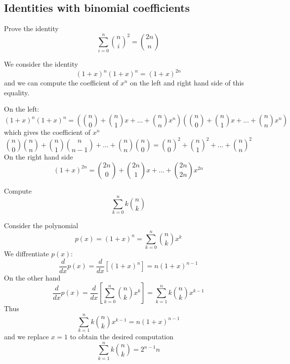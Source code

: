 \subsection*{Identities with binomial coefficients}

\begin{example}
Prove the identity
$$
\sum_{i=0}^{n} \binom{ n}  {i } ^{2}=\binom{ 2n}  {n }
$$

We consider the identity
$$
(1+x)^{n}(1+x)^{n}=(1+x)^{2n}
$$
and we can compute the coefficient of $x^{n}$ on the left and right hand side of this equality.

On the left:
$$
(1+x)^{n}(1+x)^{n}=(\binom{ n}  {0 } +\binom{ n}  {1 } x+\dots +\binom{ n}  {n}x^{n} )(\binom{ n}  {0 } +\binom{ n}  {1 } x+\dots +\binom{ n}  {n } x^{n})
$$
which gives the coefficient of $x^{n}$
$$
\binom{ n}  {0 } \binom{ n}  {n } +\binom{ n}  {1 } \binom{ n}  {n-1 } +\dots +\binom{ n}  {n } \binom{ n}  {0 } =\binom{ n}  {0 } ^{2}+\binom{ n}  {1 } ^{2}+\dots +\binom{ n}  {n } ^{2}
$$
On the right hand side
$$
(1+x)^{2n}=\binom{ 2n}  {0 } +\binom{ 2n}  {1 } x+\dots +\binom{ 2n}  {2n } x^{2n}
$$
\end{example}
\begin{example}
Compute
$$
\sum_{k=0}^{n} k\binom{ n}  {k } 
$$

Consider the polynomial $$p(x)=(1+x)^{n}=\sum_{k=0}^{n} \binom{ n}  {k }x^{k}$$
We diffrentiate $p(x)$:
$$
\frac{d}{dx}p(x)=\frac{d}{dx}[(1+x)^{n}]=n(1+x)^{n-1}
$$
On the other hand
$$
\frac{d}{dx}p(x)=\frac{d}{dx}\left[ \sum_{k=0}^{n} \binom{ n}  {k } x^{k} \right]=\sum_{k=1}^{n} k\binom{ n}  {k } x^{k-1}
$$
Thus 
$$
\sum_{k=1}^{n} k\binom{ n}  {k } x^{k-1}=n(1+x)^{n-1}
$$
and we replace $x=1$ to obtain the desired computation
$$
\sum_{k=1}^{n} k\binom{ n}  {k } =2^{n-1}n
$$
\end{example}

